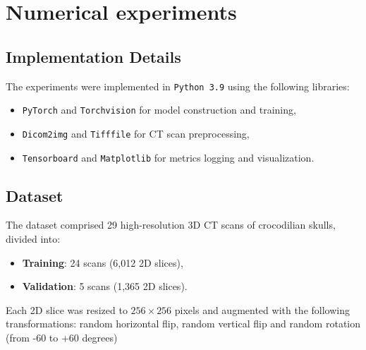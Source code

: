 \chapter{Numerical experiments}

\section{Implementation Details}  
The experiments were implemented in \texttt{Python 3.9} using the following libraries:  
\begin{itemize}  
    \item \texttt{PyTorch} and \texttt{Torchvision} for model construction and training,  
    \item \texttt{Dicom2img} and \texttt{Tifffile} for CT scan preprocessing,  
    \item \texttt{Tensorboard} and \texttt{Matplotlib} for metrics logging and visualization.  
\end{itemize}  

\section{Dataset}  
The dataset comprised 29 high-resolution 3D CT scans of crocodilian skulls, divided into:  
\begin{itemize}  
    \item \textbf{Training}: 24 scans (6,012 2D slices),  
    \item \textbf{Validation}: 5 scans (1,365 2D slices).  
\end{itemize}  
Each 2D slice was resized to \(256 \times 256\) pixels and augmented with the following transformations: random horizontal flip, random vertical flip and random rotation (from -60 to +60 degrees)

